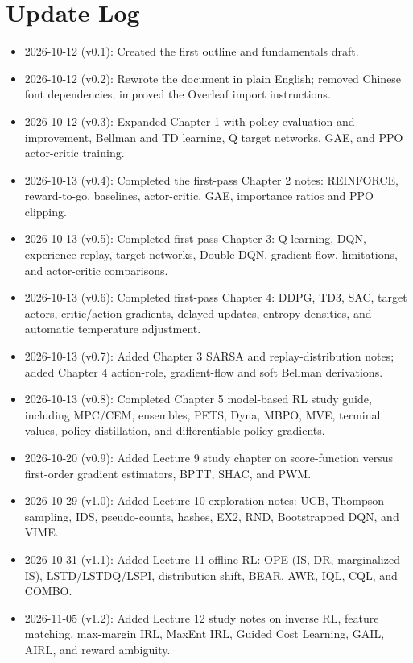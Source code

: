 \documentclass[11pt,a4paper]{book}
\begin{document}
\chapter{Update Log}
\begin{itemize}
\item 2026-10-12 (v0.1): Created the first outline and fundamentals draft.
\item 2026-10-12 (v0.2): Rewrote the document in plain English; removed Chinese font dependencies; improved the Overleaf import instructions.
\item 2026-10-12 (v0.3): Expanded Chapter 1 with policy evaluation and improvement, Bellman and TD learning, Q target networks, GAE, and PPO actor-critic training.
\item 2026-10-13 (v0.4): Completed the first-pass Chapter 2 notes: REINFORCE, reward-to-go, baselines, actor-critic, GAE, importance ratios and PPO clipping.
\item 2026-10-13 (v0.5): Completed first-pass Chapter 3: Q-learning, DQN, experience replay, target networks, Double DQN, gradient flow, limitations, and actor-critic comparisons.
\item 2026-10-13 (v0.6): Completed first-pass Chapter 4: DDPG, TD3, SAC, target actors, critic/action gradients, delayed updates, entropy densities, and automatic temperature adjustment.
\item 2026-10-13 (v0.7): Added Chapter 3 SARSA and replay-distribution notes; added Chapter 4 action-role, gradient-flow and soft Bellman derivations.
\item 2026-10-13 (v0.8): Completed Chapter 5 model-based RL study guide, including MPC/CEM, ensembles, PETS, Dyna, MBPO, MVE, terminal values, policy distillation, and differentiable policy gradients.
\item 2026-10-20 (v0.9): Added Lecture 9 study chapter on score-function versus first-order gradient estimators, BPTT, SHAC, and PWM.
\item 2026-10-29 (v1.0): Added Lecture 10 exploration notes: UCB, Thompson sampling, IDS, pseudo-counts, hashes, EX2, RND, Bootstrapped DQN, and VIME.
\item 2026-10-31 (v1.1): Added Lecture 11 offline RL: OPE (IS, DR, marginalized IS), LSTD/LSTDQ/LSPI, distribution shift, BEAR, AWR, IQL, CQL, and COMBO.
\item 2026-11-05 (v1.2): Added Lecture 12 study notes on inverse RL, feature matching, max-margin IRL, MaxEnt IRL, Guided Cost Learning, GAIL, AIRL, and reward ambiguity.
\end{itemize}
\end{document}
